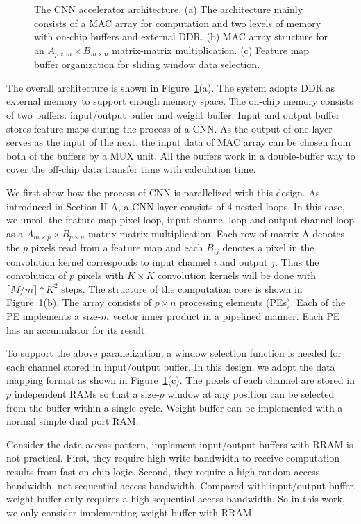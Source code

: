 \begin{figure}[t]
  \vspace{-10pt}
  \caption{The CNN accelerator architecture. (a) The architecture mainly consists of a MAC array for computation and two levels of memory with on-chip buffers and external DDR. (b) MAC array structure for an $A_{p\times m}\times B_{m\times n}$ matrix-matrix multiplication. (c) Feature map buffer organization for sliding window data selection.}
  \vspace{-15pt}
  \label{fig:arch}
\end{figure}

The overall architecture is shown in Figure~\ref{fig:arch}(a). The system adopts DDR as external memory to support enough memory space. The on-chip memory consists of two buffers: input/output buffer and weight buffer. Input and output buffer stores feature maps during the process of a CNN. As the output of one layer serves as the input of the next, the input data of MAC array can be chosen from both of the buffers by a MUX unit. All the buffers work in a double-buffer way to cover the off-chip data transfer time with calculation time.

We first show how the process of CNN is parallelized with this design. As introduced in Section II A, a CNN layer consists of 4 nested loops. In this case, we unroll the feature map pixel loop, input channel loop and output channel loop as a $A_{m\times p}\times B_{p\times n}$ matrix-matrix multiplication. Each row of matrix A denotes the $p$ pixels read from a feature map and each $B_{ij}$ denotes a pixel in the convolution kernel corresponds to input channel $i$ and output $j$. Thus the convolution of $p$ pixels with $K\times K$ convolution kernels will be done with $\lceil M/m\rceil*K^2$ steps. The structure of the computation core is shown in Figure~\ref{fig:arch}(b). The array consists of $p\times n$ processing elements (PEs). Each of the PE implements a size-$m$ vector inner product in a pipelined manner. Each PE has an accumulator for its result. 

To support the above parallelization, a window selection function is needed for each channel stored in input/output buffer. In this design, we adopt the data mapping format as shown in Figure~\ref{fig:arch}(c). The pixels of each channel are stored in $p$ independent RAMs so that a size-$p$ window at any position can be selected from the buffer within a single cycle. Weight buffer can be implemented with a normal simple dual port RAM.

Consider the data access pattern, implement input/output buffers with RRAM is not practical. First, they require high write bandwidth to receive computation results from fast on-chip logic. Second, they require a high random access bandwidth, not sequential access bandwidth. Compared with input/output buffer, weight buffer only requires a high sequential access bandwidth. So in this work, we only consider implementing weight buffer with RRAM.


